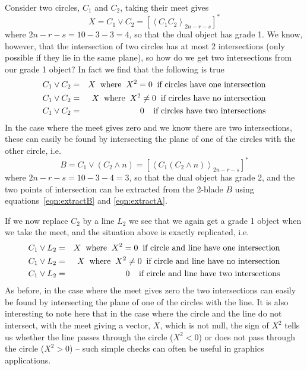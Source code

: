 Consider two circles, $C_1$ and $C_2$, taking their meet
gives
%
\begin{equation}
X = C_1 \vee C_2 = \left[\left< C_1 C_2
\right>_{2n-r-s}\right]^*
\end{equation}
%
where $2n-r-s=10-3-3=4$, so that the dual object has
grade 1. We know, however, that the intersection of two
circles has at most 2 intersections (only possible if
they lie in the same plane), so how do we get two
intersections from our grade 1 object? In fact we find
that the following is true
%
\begin{eqnarray}
C_1 \vee C_2  &  =  &  X \;\;\mbox{where}\;\;
X^2=0\;\;\mbox{if circles have one intersection} \nonumber \\
C_1 \vee C_2  &  =  &  X \;\;\mbox{where}\;\;
X^2\ne 0\;\;\mbox{if circles have no intersection} \nonumber \\
C_1 \vee C_2  &  =  &  0 \;\; \;\;\mbox{if circles have
two intersections}
\end{eqnarray}
%
In the case where the meet gives zero and we know there
are two intersections, these can easily be found by
intersecting the plane of one of the circles with the
other circle, i.e.
%
\begin{equation}
B = C_1 \vee (C_2\wedge n) =  \left[\left< C_1 (C_2\wedge n)
\right>_{2n-r-s}\right]^*
\end{equation}
%
where $2n-r-s=10-3-4=3$, so that the dual object has
grade 2, and the two points of intersection can be
extracted from the 2-blade $B$ using
equations~\ref{eqn:extractB} and \ref{eqn:extractA}.

If we now replace $C_2$ by a line $L_2$ we see that we
again get a grade 1 object when we take the meet, and the
situation above is exactly replicated, i.e.
%
\begin{eqnarray}
C_1 \vee L_2  &  =  &  X \;\;\mbox{where}\;\;
X^2=0\;\;\mbox{if circle and line have one intersection} \nonumber \\
C_1 \vee L_2  &  =  &  X \;\;\mbox{where}\;\;
X^2\ne 0\;\;\mbox{if circle and line have no intersection} \nonumber \\
C_1 \vee L_2  &  =  &  0 \;\; \;\;\mbox{if circle and
line have two intersections}
\end{eqnarray}
%
As before, in the case where the meet gives zero the two
intersections can easily be found by intersecting the
plane of one of the circles with the line. It is also
interesting to note here that in the case where the
circle and the line do not intersect, with the meet
giving a vector, $X$, which is not null, the sign of
$X^2$ tells us whether the line passes through the circle
($X^2<0$) or does not pass through the circle ($X^2>0$)
-- such simple checks can often be useful in graphics
applications.


